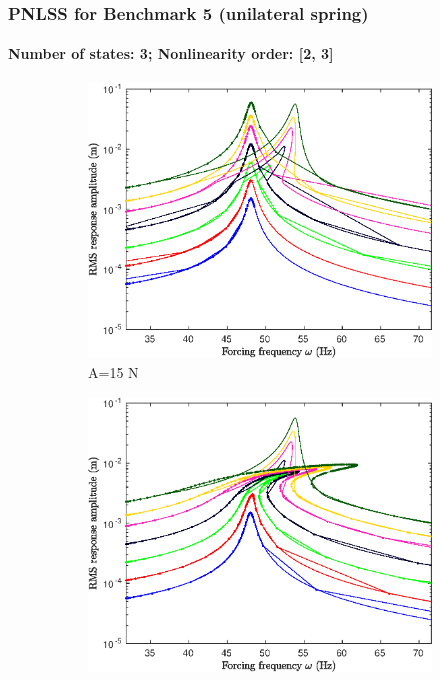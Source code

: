 \documentclass[aspectratio=169]{beamer}
\begin{document}
\begin{frame}
  \frametitle{PNLSS for Benchmark 5 (unilateral spring)}
  \framesubtitle{Number of states: 3; Nonlinearity order: [2, 3]}  
  \begin{figure}
    \centering
    \begin{subfigure}{0.25\linewidth}
      \includegraphics[width=\linewidth]{../../benchmark5/FIGURES/pnlssfrf_Amp_b5_A15_up4_ms_full_na2_nx23}
      \caption{A=15 N}
    \end{subfigure}%
    \begin{subfigure}{0.25\linewidth}
      \includegraphics[width=\linewidth]{../../benchmark5/FIGURES/pnlssfrf_Amp_b5_A30_up4_ms_full_na2_nx23}

\end{subfigure}
\end{figure}
\end{frame}
\end{document}
